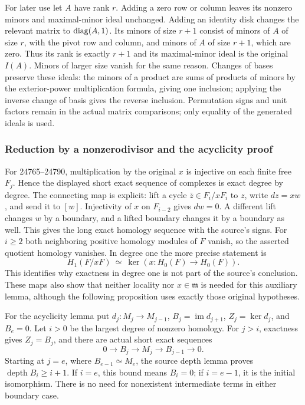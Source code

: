 For later use let \(A\) have rank \(r\). Adding a zero row or column leaves its nonzero minors and maximal-minor ideal unchanged. Adding an identity disk changes the relevant matrix to \({\rm diag}(A,1)\). Its minors of size \(r+1\) consist of minors of \(A\) of size \(r\), with the pivot row and column, and minors of \(A\) of size \(r+1\), which are zero. Thus its rank is exactly \(r+1\) and its maximal-minor ideal is the original \(I(A)\). Minors of larger size vanish for the same reason. Changes of bases preserve these ideals: the minors of a product are sums of products of minors by the exterior-power multiplication formula, giving one inclusion; applying the inverse change of basis gives the reverse inclusion. Permutation signs and unit factors remain in the actual matrix comparisons; only equality of the generated ideals is used.

\subsubsection{Reduction by a nonzerodivisor and the acyclicity proof}\label{algebra-proof-018-reduction-by-a-nonzerodivisor-and-the-acyclicity-proof}

For 24765--24790, multiplication by the original \(x\) is injective on each finite free \(F_j\). Hence the displayed short exact sequence of complexes is exact degree by degree. The connecting map is explicit: lift a cycle \(\bar z\in F_i/xF_i\) to \(z\), write \(dz=xw\), and send it to \([w]\). Injectivity of \(x\) on \(F_{i-2}\) gives \(dw=0\). A different lift changes \(w\) by a boundary, and a lifted boundary changes it by a boundary as well. This gives the long exact homology sequence with the source's signs. For \(i\ge2\) both neighboring positive homology modules of \(F\) vanish, so the asserted quotient homology vanishes. In degree one the more precise statement is \[
 H_1(F/xF)\ \simeq\ \ker(x:H_0(F)\longrightarrow H_0(F)).
\] This identifies why exactness in degree one is not part of the source's conclusion. These maps also show that neither locality nor \(x\in\mathfrak m\) is needed for this auxiliary lemma, although the following proposition uses exactly those original hypotheses.

For the acyclicity lemma put \(d_j:M_j\to M_{j-1}\), \(B_j=\operatorname{im}d_{j+1}\), \(Z_j=\ker d_j\), and \(B_e=0\). Let \(i>0\) be the largest degree of nonzero homology. For \(j>i\), exactness gives \(Z_j=B_j\), and there are actual short exact sequences \[
 0\longrightarrow B_j\longrightarrow M_j\longrightarrow B_{j-1}
 \longrightarrow0 .
\] Starting at \(j=e\), where \(B_{e-1}\simeq M_e\), the source depth lemma proves \(\operatorname{depth}B_i\ge i+1\). If \(i=e\), this bound means \(B_i=0\); if \(i=e-1\), it is the initial isomorphism. There is no need for nonexistent intermediate terms in either boundary case.

